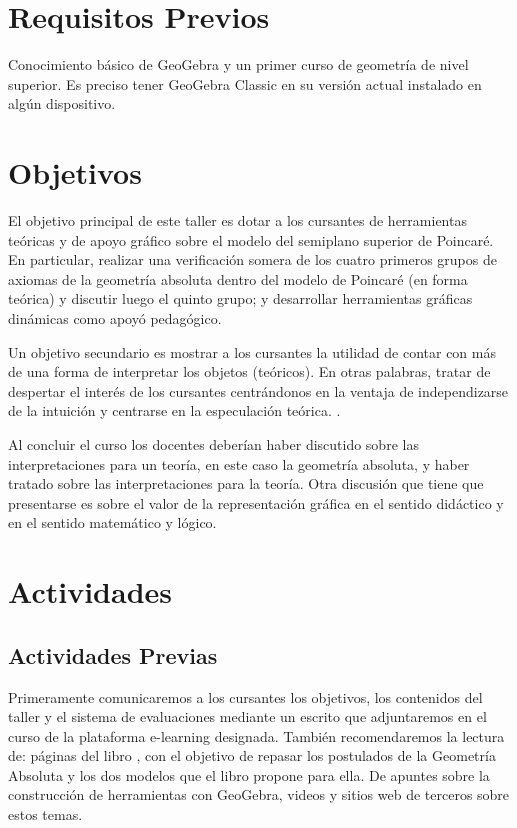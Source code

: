 \documentclass[oneside,spanish]{amsart}
\numberwithin{equation}{section}
\numberwithin{figure}{section}
\theoremstyle{definition}
\begin{document}
\section{Requisitos Previos}

Conocimiento básico de GeoGebra y un primer curso de geometría de nivel superior. Es preciso tener GeoGebra Classic en su versión actual instalado en algún dispositivo.

\section{Objetivos}

El objetivo principal de este taller es dotar a los cursantes de herramientas teóricas y de apoyo gráfico sobre el modelo del semiplano superior de Poincaré. En particular, realizar una verificación somera de los cuatro primeros grupos de axiomas de la geometría absoluta dentro del modelo de Poincaré (en forma teórica) y discutir luego el quinto grupo; y desarrollar herramientas gráficas dinámicas como apoyó pedagógico. 

Un objetivo secundario es mostrar a los cursantes la utilidad de contar con más de una forma de interpretar los objetos (teóricos). En otras palabras, tratar de despertar el interés de los cursantes centrándonos en la ventaja de independizarse de la intuición y centrarse en la especulación teórica. \citet{dreher15}.

Al concluir el curso los docentes deberían haber discutido sobre las interpretaciones para un teoría, en este caso la geometría absoluta, y haber tratado sobre las interpretaciones para la teoría. Otra discusión que tiene que presentarse es sobre el valor de la representación gráfica en el sentido didáctico y en el sentido matemático y lógico.

\section{Actividades}

\subsection{Actividades Previas\label{subsec:Actividades-Previas}}

Primeramente comunicaremos a los cursantes los objetivos, los contenidos del taller y el sistema de evaluaciones mediante un escrito que adjuntaremos en el curso de la plataforma e-learning designada. También recomendaremos la lectura de: páginas del libro \citet{efimov84}, con el objetivo de repasar los postulados de la Geometría Absoluta y los dos modelos que el libro propone para ella. De apuntes sobre la construcción de herramientas con GeoGebra, videos y sitios web de terceros sobre estos temas.
\end{document}
